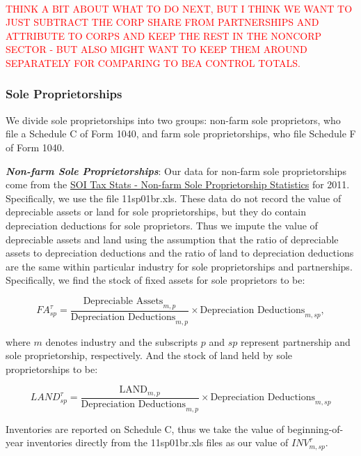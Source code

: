 \documentclass[article,11pt,letterpaper,fleqn]{article}
\theoremstyle{definition}
\numberwithin{equation}{section}
\begin{document}
\ \\
\textcolor{red}{THINK A BIT ABOUT WHAT TO DO NEXT, BUT I THINK WE WANT TO JUST SUBTRACT THE CORP SHARE FROM PARTNERSHIPS AND ATTRIBUTE TO CORPS AND KEEP THE REST IN THE NONCORP SECTOR - BUT ALSO MIGHT WANT TO KEEP THEM AROUND SEPARATELY FOR COMPARING TO BEA CONTROL TOTALS.}
\ \\
\subsubsection{Sole Proprietorships}

We divide sole proprietorships into two groups: non-farm sole proprietors, who file a Schedule C of Form 1040, and farm sole proprietorships, who file Schedule F of Form 1040.  

\textbf{\emph{Non-farm Sole Proprietorships}}:  Our data for non-farm sole proprietorships come from the \href{http://www.irs.gov/uac/SOI-Tax-Stats-Nonfarm-Sole-Proprietorship-Statistics}{SOI Tax Stats - Non-farm Sole Proprietorship Statistics} for 2011.  Specifically, we use the file 11sp01br.xls.  These data do not record the value of depreciable assets or land for sole proprietorships, but they do contain depreciation deductions for sole proprietors.  Thus we impute the value of depreciable assets and land using the assumption that the ratio of depreciable assets to depreciation deductions and the ratio of land to depreciation deductions are the same within particular industry for sole proprietorships and partnerships.  Specifically, we find the stock of fixed assets for sole proprietors to be: 

\begin{equation}
{FA}^{\tau}_{sp}=\frac{\text{Depreciable Assets}_{m,p}}{\text{Depreciation Deductions}_{m,p}}\times \text{Depreciation Deductions}_{m,sp},
\end{equation}

\noindent\noindent where $m$ denotes industry and the subscripts $p$ and $sp$ represent partnership and sole proprietorship, respectively.  And the stock of land held by sole proprietorships to be: 

\begin{equation}
{LAND}^{\tau}_{sp}=\frac{\text{LAND}_{m,p}}{\text{Depreciation Deductions}_{m,p}}\times \text{Depreciation Deductions}_{m,sp}
\end{equation}

Inventories are reported on Schedule C, thus we take the value of beginning-of-year inventories directly from the 11sp01br.xls files as our value of ${INV}^{\tau}_{m,sp}$.
\end{document}
